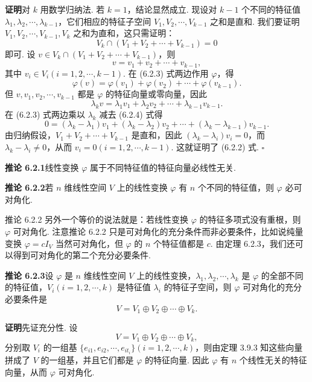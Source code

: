\documentclass[UTF8,12pt,a4paper,fontset=fandol]{ctexart}
\begin{document}
\noindent\textbf{证明}\quad 对 $k$ 用数学归纳法. 若 $k=1$，结论显然成立. 现设对 $k-1$ 个不同的特征值 $\lambda_1,\lambda_2,\cdots,\lambda_{k-1}$，它们相应的特征子空间 $V_1,V_2,\cdots,V_{k-1}$ 之和是直和. 我们要证明 $V_1,V_2,\cdots,V_{k-1},V_k$ 之和为直和，这只需证明：
\begin{equation}
V_k\cap (V_1+V_2+\cdots+V_{k-1})=0
\tag{6.2.2}
\end{equation}
即可. 设 $v\in V_k\cap (V_1+V_2+\cdots+V_{k-1})$，则
\begin{equation}
v=v_1+v_2+\cdots+v_{k-1},
\tag{6.2.3}
\end{equation}
其中 $v_i\in V_i(i=1,2,\cdots,k-1)$. 在 (6.2.3) 式两边作用 $\varphi$，得
\[
\varphi(v)=\varphi(v_1)+\varphi(v_2)+\cdots+\varphi(v_{k-1}).
\]
但 $v,v_1,v_2,\cdots,v_{k-1}$ 都是 $\varphi$ 的特征向量或零向量，因此
\begin{equation}
\lambda_kv=\lambda_1v_1+\lambda_2v_2+\cdots+\lambda_{k-1}v_{k-1}.
\tag{6.2.4}
\end{equation}
在 (6.2.3) 式两边乘以 $\lambda_k$ 减去 (6.2.4) 式得
\[
0=(\lambda_k-\lambda_1)v_1+(\lambda_k-\lambda_2)v_2+\cdots+(\lambda_k-\lambda_{k-1})v_{k-1}.
\]
由归纳假设，$V_1+V_2+\cdots+V_{k-1}$ 是直和，因此 $(\lambda_k-\lambda_i)v_i=0$，而 $\lambda_k-\lambda_i\neq 0$，从而 $v_i=0(i=1,2,\cdots,k-1)$. 这就证明了 (6.2.2) 式. $\square$

\noindent\textbf{推论 6.2.1}\quad 线性变换 $\varphi$ 属于不同特征值的特征向量必线性无关.

\noindent\textbf{推论 6.2.2}\quad 若 $n$ 维线性空间 $V$ 上的线性变换 $\varphi$ 有 $n$ 个不同的特征值，则 $\varphi$ 必可对角化.

推论 6.2.2 另外一个等价的说法就是：若线性变换 $\varphi$ 的特征多项式没有重根，则 $\varphi$ 可对角化. 注意推论 6.2.2 只是可对角化的充分条件而非必要条件，比如说纯量变换 $\varphi=cI_V$ 当然可对角化，但 $\varphi$ 的 $n$ 个特征值都是 $c$. 由定理 6.2.3，我们还可以得到可对角化的第二个充分必要条件.

\noindent\textbf{推论 6.2.3}\quad 设 $\varphi$ 是 $n$ 维线性空间 $V$ 上的线性变换，$\lambda_1,\lambda_2,\cdots,\lambda_k$ 是 $\varphi$ 的全部不同的特征值，$V_i(i=1,2,\cdots,k)$ 是特征值 $\lambda_i$ 的特征子空间，则 $\varphi$ 可对角化的充分必要条件是
\[
V=V_1\oplus V_2\oplus\cdots\oplus V_k.
\]

\noindent\textbf{证明}\quad 先证充分性. 设
\[
V=V_1\oplus V_2\oplus\cdots\oplus V_k,
\]
分别取 $V_i$ 的一组基 $\{e_{i1},e_{i2},\cdots,e_{it_i}\}(i=1,2,\cdots,k)$，则由定理 3.9.3 知这些向量拼成了 $V$ 的一组基，并且它们都是 $\varphi$ 的特征向量. 因此 $\varphi$ 有 $n$ 个线性无关的特征向量，从而 $\varphi$ 可对角化.
\end{document}
